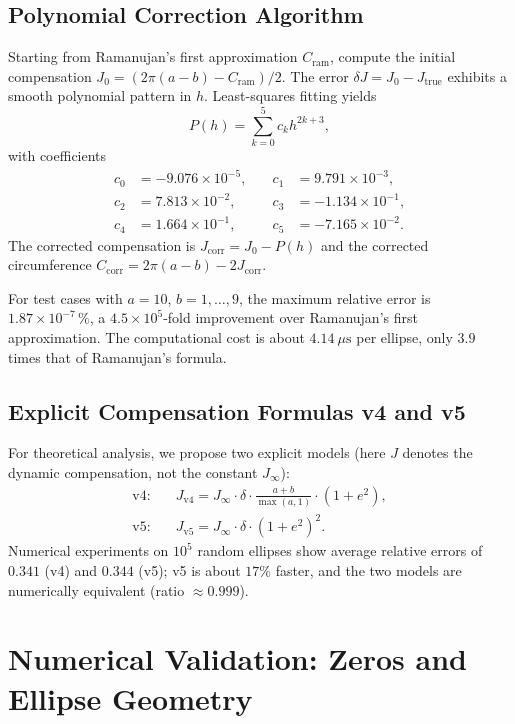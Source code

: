 \documentclass[12pt,a4paper]{article}
\DeclareMathOperator{\maxop}{max}
\begin{document}
\subsection{Polynomial Correction Algorithm}\label{subsec:poly}
Starting from Ramanujan's first approximation $C_{\text{ram}}$, compute the initial compensation $J_0 = (2\pi(a-b)-C_{\text{ram}})/2$. The error $\delta J = J_0 - J_{\text{true}}$ exhibits a smooth polynomial pattern in $h$. Least-squares fitting yields
\begin{equation}\label{eq:poly}
P(h) = \sum_{k=0}^{5} c_k h^{2k+3},
\end{equation}
with coefficients
\[
\begin{aligned}
c_0 &= -9.076\times10^{-5}, &\quad c_1 &= 9.791\times10^{-3},\\
c_2 &= 7.813\times10^{-2}, &\quad c_3 &= -1.134\times10^{-1},\\
c_4 &= 1.664\times10^{-1}, &\quad c_5 &= -7.165\times10^{-2}.
\end{aligned}
\]
The corrected compensation is $J_{\text{corr}} = J_0 - P(h)$ and the corrected circumference $C_{\text{corr}} = 2\pi(a-b)-2J_{\text{corr}}$.

For test cases with $a=10$, $b=1,\dots,9$, the maximum relative error is $1.87\times10^{-7}\,\%$, a $4.5\times10^{5}$-fold improvement over Ramanujan's first approximation. The computational cost is about $4.14\ \mu\text{s}$ per ellipse, only $3.9$ times that of Ramanujan's formula.

\subsection{Explicit Compensation Formulas v4 and v5}\label{subsec:v4v5}
For theoretical analysis, we propose two explicit models (here $J$ denotes the dynamic compensation, not the constant $J_\infty$):
\begin{align}
\text{v4:}\quad & J_{\text{v4}} = J_\infty \cdot \delta \cdot \frac{a+b}{\maxop(a,1)} \cdot (1+e^2),\label{eq:v4}\\
\text{v5:}\quad & J_{\text{v5}} = J_\infty \cdot \delta \cdot (1+e^2)^2.\label{eq:v5}
\end{align}
Numerical experiments on $10^5$ random ellipses show average relative errors of $0.341$ (v4) and $0.344$ (v5); v5 is about $17\%$ faster, and the two models are numerically equivalent (ratio $\approx 0.999$).

\section{Numerical Validation: Zeros and Ellipse Geometry}\label{sec:validation}
\end{document}
